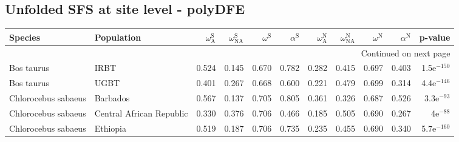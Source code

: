 \subsection{Unfolded SFS at site level - polyDFE} 
\begin{longtable}{llrrrrrrrrr}
\toprule
             Species &                Population & $\omega_{\textrm{A}}^{\textrm{S}}$ & $\omega_{\textrm{NA}}^{\textrm{S}}$ & $\omega^{\textrm{S}}$ & $\alpha^{\textrm{S}}$ & $\omega_{\textrm{A}}^{\textrm{N}}$ & $\omega_{\textrm{NA}}^{\textrm{N}}$ & $\omega^{\textrm{N}}$ & $\alpha^{\textrm{N}}$ &       p-value \\
\midrule
\endhead
\midrule
\multicolumn{11}{r}{{Continued on next page}} \\
\midrule
\endfoot

\bottomrule
\endlastfoot
          Bos taurus &                      IRBT &                              0.524 &                               0.145 &                 0.670 &                 0.782 &                              0.282 &                               0.415 &                 0.697 &                 0.403 & 1.5e$^{-150}$ \\
          Bos taurus &                      UGBT &                              0.401 &                               0.267 &                 0.668 &                 0.600 &                              0.221 &                               0.479 &                 0.699 &                 0.314 & 4.4e$^{-146}$ \\
 Chlorocebus sabaeus &                  Barbados &                              0.567 &                               0.137 &                 0.705 &                 0.805 &                              0.361 &                               0.326 &                 0.687 &                 0.526 &  3.3e$^{-93}$ \\
 Chlorocebus sabaeus &  Central African Republic &                              0.330 &                               0.376 &                 0.706 &                 0.466 &                              0.185 &                               0.505 &                 0.690 &                 0.267 &    4e$^{-88}$ \\
 Chlorocebus sabaeus &                  Ethiopia &                              0.519 &                               0.187 &                 0.706 &                 0.735 &                              0.235 &                               0.455 &                 0.690 &                 0.340 & 5.7e$^{-160}$ \\

\end{longtable}
